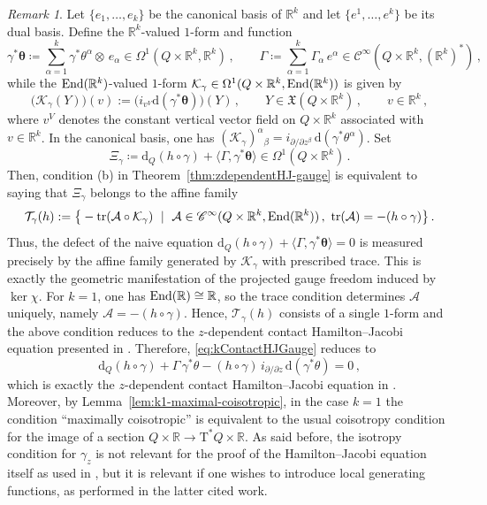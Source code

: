 \documentclass[11pt,twoside]{article}
\theoremstyle{plain}
\theoremstyle{definition}
\theoremstyle{remark}
\newtheorem{remark}[theorem]{Remark}
\newcommand{\dd}{\mathrm{d}}
\newcommand{\Cinfty}{\mathscr{C}^\infty}
\newcommand{\T}{\mathrm{T}}
\begin{document}
\begin{remark}\label{rem:geometric-HJ-condition}
    Let \(\{e_1,\ldots,e_k\}\) be the canonical basis of \(\mathbb R^k\) and let \(\{e^1,\ldots,e^k\}\) be its dual basis. Define the \(\mathbb R^k\)-valued \(1\)-form and function
    \[
        \gamma^*\bm\theta\coloneqq\sum_{\alpha=1}^k \gamma^*\theta^\alpha\otimes \,e_\alpha\in \Omega^1(Q\times\mathbb R^k,\mathbb R^k)\,,\qquad \Gamma\coloneqq\sum_{\alpha=1}^k \Gamma_\alpha\,e^\alpha\in \Cinfty(Q\times\mathbb R^k,(\mathbb R^k)^*)\,,
    \]
    while the \({\rm End}(\mathbb{R}^k)\)-valued \(1\)-form \(\mathcal K_\gamma\in \Omega^1(Q\times\mathbb R^k,{\rm End}(\mathbb R^k))\) is given by
    \[
        \bigl(\mathcal K_\gamma(Y)\bigr)(v):=\bigl(i_{v^V}\dd(\gamma^*\bm\theta)\bigr)(Y)\,,\qquad Y\in\mathfrak X(Q\times\mathbb R^k)\,,\qquad v\in\mathbb R^k\,,
    \]
    where \(v^V\) denotes the constant vertical vector field on \(Q\times\mathbb R^k\) associated with \(v\in\mathbb R^k\). In the canonical basis, one has \((\mathcal K_\gamma)^\alpha{}_\beta=i_{\partial/\partial z^\beta}\,\dd(\gamma^*\theta^\alpha)\). Set
    \[
        \Xi_\gamma\coloneqq\dd_Q(h\circ\gamma)+\langle \Gamma,\gamma^*\bm\theta\rangle\in \Omega^1(Q\times\mathbb R^k)\,.
    \]
    Then, condition (b) in Theorem~\ref{thm:zdependentHJ-gauge} is equivalent to saying that \(\Xi_\gamma\) belongs to the affine family
    \[
        \mathcal T_\gamma(h):=\big\{-\operatorname{tr}(\mathcal A\circ \mathcal K_\gamma)\ \mid\ \mathcal A\in \Cinfty(Q\times\mathbb R^k,{\rm End}(\mathbb R^k))\,,\ \operatorname{tr}(\mathcal A)=-(h\circ\gamma)\big\}\,.
    \]
    Thus, the defect of the naive equation \(\dd_Q(h\circ\gamma)+\langle \Gamma,\gamma^*\bm\theta\rangle=0\) is measured precisely by the affine family generated by \(\mathcal K_\gamma\) with prescribed trace. This is exactly the geometric manifestation of the projected gauge freedom induced by \(\ker\chi\). For \(k=1\), one has \({\rm End}(\mathbb R)\cong \mathbb R\), so the trace condition determines \(\mathcal A\) uniquely, namely \(\mathcal A=-(h\circ\gamma)\). Hence, \(\mathcal T_\gamma(h)\) consists of a single \(1\)-form and the above condition reduces to the \(z\)-dependent contact Hamilton--Jacobi equation presented in \cite{LLM_21a}. Therefore, \eqref{eq:kContactHJGauge} reduces to
    \[
        \dd_Q(h\circ\gamma)+\Gamma\,\gamma^*\theta-(h\circ\gamma)\,i_{\partial/\partial z}\,\dd(\gamma^*\theta)=0\,,
    \]
    which is exactly the \(z\)-dependent contact Hamilton--Jacobi equation in \cite{LLM_21a}. Moreover, by Lemma~\ref{lem:k1-maximal-coisotropic}, in the case \(k=1\) the condition ``maximally coisotropic'' is equivalent to the usual coisotropy condition for the image of a section \(Q\times\mathbb R\to \T^*Q\times\mathbb R\). As said before, the isotropy condition for \(\gamma_z\) is not relevant for the proof of the Hamilton--Jacobi equation itself as used in \cite{LLM_21a}, but it is relevant if one wishes to introduce local generating functions, as performed in the latter cited work.    
\end{remark}
\end{document}
